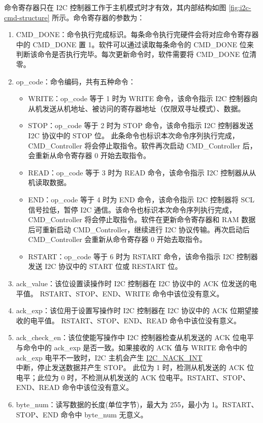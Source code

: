 \documentclass[main\_\_CN.tex]{subfiles}
\begin{document}
命令寄存器只在 I2C 控制器工作于主机模式时才有效，其内部结构如图 \ref{fig:i2c-cmd-structure} 所示。命令寄存器的参数为：
\begin{enumerate}

\item CMD\_DONE：命令执行完成标识。每条命令执行完硬件会将对应命令寄存器中的 CMD\_DONE 置 1。软件可以通过读取每条命令的 CMD\_DONE 位来判断该命令是否执行完毕。每次更新命令时，软件需要将 CMD\_DONE 位清零。

\item op\_code：命令编码，共有五种命令：

\begin{itemize}

    \item WRITE：op\_code 等于 1 时为 WRITE 命令，该命令指示 I2C 控制器向从机发送从机地址、被访问的寄存器地址（仅限双寻址模式）、数据。
    
    \item STOP：op\_code 等于 2 时为 STOP 命令，该命令指示 I2C 控制器发送 I2C 协议中的 STOP 位。 此条命令也标识本次命令序列执行完成，CMD\_Controller 将会停止取指令。软件再次启动 CMD\_Controller 后，会重新从命令寄存器 0 开始去取指令。
    
    \item READ：op\_code 等于 3 时为 READ 命令，该命令指示 I2C 控制器从从机读取数据。
    
    \item END：op\_code 等于 4 时为 END 命令，该命令指示 I2C 控制器将 SCL 信号拉低，暂停 I2C 通信。该命令也标识本次命令序列执行完成，CMD\_Controller 将会停止取指令。软件在更新命令寄存器和 RAM 数据后可重新启动 CMD\_Controller，继续进行 I2C 协议传输。再次启动后 CMD\_Controller 会重新从命令寄存器 0 开始去取指令。 

    \item RSTART：op\_code 等于 6 时为 RSTART 命令，该命令指示 I2C 控制器发送 I2C 协议中的 START 位或 RESTART 位。
\end{itemize}

\item ack\_value：该位设置读操作时 I2C 控制器在 I2C 协议中的 ACK 位发送的电平值。 RSTART、STOP、END、WRITE 命令中该位没有意义。

\item ack\_exp：该位用于设置写操作时 I2C 控制器在 I2C 协议中的 ACK 位期望接收的电平值。 RSTART、STOP、END、READ 命令中该位没有意义。

\item ack\_check\_en：该位使能写操作中 I2C 控制器检查从机发送的 ACK 位电平与命令中的 ack\_exp 是否一致。如果接收的 ACK 值与 WRITE 命令中的 ack\_exp 电平不一致时，I2C 主机会产生 \hyperref[int:i2c-nack]{I2C\_NACK\_INT}\\ 中断，停止发送数据并产生 STOP。 此位为 1 时，检测从机发送的 ACK 位电平；此位为 0 时，不检测从机发送的 ACK 位电平。RSTART、STOP、END、READ 命令中该位没有意义。

\item byte\_num：读写数据的长度(单位字节)，最大为 255，最小为 1。RSTART、STOP、END 命令中 byte\_num 无意义。

\end{enumerate}
\end{document}
